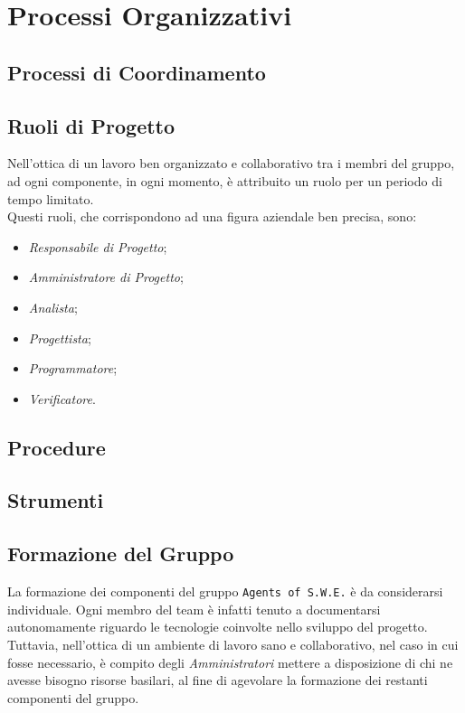 \section{Processi Organizzativi}

\subsection{Processi di Coordinamento}


\subsection{Ruoli di Progetto}
	Nell'ottica di un lavoro ben organizzato e collaborativo tra i membri del gruppo, ad ogni componente, in ogni 					momento, è attribuito un ruolo per un periodo di tempo limitato.\\
	Questi ruoli, che corrispondono ad una figura aziendale ben precisa, sono:
	\begin{itemize}
	\item \textit{Responsabile di Progetto};
	\item \textit{Amministratore di Progetto};
	\item \textit{Analista};
	\item \textit{Progettista};
	\item \textit{Programmatore};
	\item \textit{Verificatore}.
	\end{itemize}
	

\subsection{Procedure}


\subsection{Strumenti}


\subsection{Formazione del Gruppo}
	La formazione dei componenti del gruppo \texttt{Agents of S.W.E.} è da considerarsi individuale. Ogni membro del 			team è infatti tenuto a documentarsi autonomamente riguardo le tecnologie coinvolte nello sviluppo del 								progetto\glossario. Tuttavia, nell'ottica di un ambiente di lavoro sano e collaborativo, nel caso in cui fosse 				necessario, è compito degli \textit{Amministratori} mettere a disposizione di chi ne avesse bisogno risorse 						basilari, al fine di	agevolare la formazione dei restanti componenti del gruppo.
